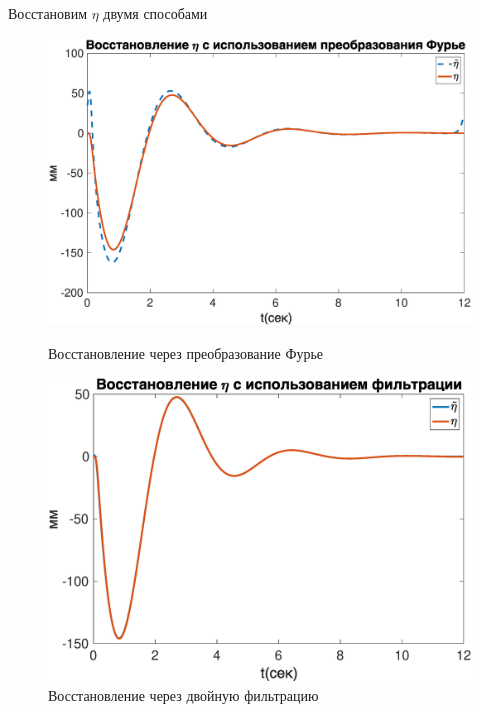 \documentclass[a4paper,12pt, openany]{book}
\theoremstyle{plain} %
\theoremstyle{definition} %
\theoremstyle{remark} %
\numberwithin{equation}{chapter}
\begin{document}
{Восстановим $\eta$ двумя способами
\begin{figure}[h!]
    \begin{center}
        \begin{minipage}[h]{0.5\linewidth}
            \includegraphics[width=1\linewidth]{eta_restore_fur_model.eps}
            \caption{Восстановление через преобразование Фурье}
        \end{minipage}
        \hfill
        \begin{minipage}[h]{0.48\linewidth}
            \includegraphics[width=1\linewidth]{double_filter_model.eps}
            \caption{Восстановление через двойную фильтрацию}
        \end{minipage}
    \end{center}
\end{figure}


}
\end{document}
